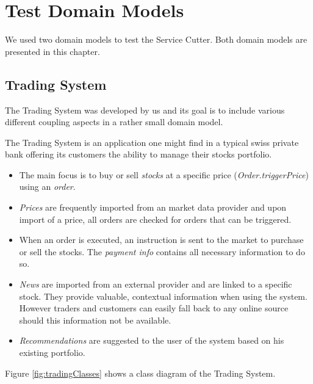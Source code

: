 \chapter{Test Domain Models}

We used two domain models to test the Service Cutter. Both domain models are presented in this chapter.

\section{Trading System}

The Trading System was developed by us and its goal is to include various different coupling aspects in a rather small domain model.

The Trading System is an application one might find in a typical swiss private bank offering its customers the ability to manage their stocks portfolio.

\begin{itemize}
\item The main focus is to buy or sell \textit{stocks} at a specific price (\textit{Order.triggerPrice}) using an \textit{order}.
\item \textit{Prices} are frequently imported from an market data provider and upon import of a price, all orders are checked for orders that can be triggered.
\item When an order is executed, an instruction is sent to the market to purchase or sell the stocks. The \textit{payment info} contains all necessary information to do so. 
\item \textit{News} are imported from an external provider and are linked to a specific stock. They provide valuable, contextual information when using the system. However traders and customers can easily fall back to any online source should this information not be available.
\item \textit{Recommendations} are suggested to the user of the system based on his existing portfolio.
\end{itemize}

Figure \ref{fig:tradingClasses} shows a class diagram of the Trading System.

